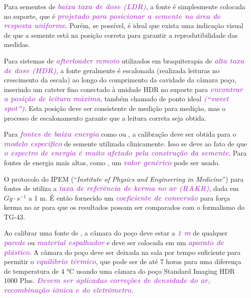 \documentclass[11pt,a4paper]{article}
\begin{document}
	
	Para sementes de \textcolor{MediumOrchid}{\textbf{\textit{baixa taxa de dose (LDR)}}}, a fonte é simplesmente colocada no suporte, que é \textcolor{MediumOrchid}{\textbf{\textit{projetado para posicionar a semente na área de resposta uniforme}}}. Porém, se possível, é ideal que exista uma indicação visual de que a semente está na posição correta para garantir a reprodutibilidade das medidas.

	Para sistemas de \textcolor{MediumOrchid}{\textbf{\textit{afterloader remoto}}} utilizados em braquiterapia de \textcolor{MediumOrchid}{\textbf{\textit{alta taxa de dose (HDR)}}}, a fonte geralmente é escalonada (realizada leituras no crescimento da escala) ao longo do comprimento da cavidade da câmara poço, inserindo um cateter fino conectado à unidade HDR no suporte para \textcolor{MediumOrchid}{\textbf{\textit{encontrar a posição de leitura máxima}}}, também chamado de ponto ideal \textcolor{MediumOrchid}{\textbf{\textit{(``sweet spot'')}}}. Esta posição deve ser consistente de medição para medição, mas o processo de escalonamento garante que a leitura correta seja obtida.

	Para \textcolor{MediumOrchid}{\textbf{\textit{fontes de baixa energia}}} como  ou , a calibração deve ser obtida para o \textcolor{MediumOrchid}{\textbf{\textit{modelo específico}}} de semente utilizada clinicamente. Isso se deve ao fato de que \textcolor{MediumOrchid}{\textbf{\textit{o espectro de energia é muito afetado pela construção da semente}}}. Para fontes de energia mais altas, como , um \textcolor{MediumOrchid}{\textbf{\textit{valor genérico}}} pode ser usado.

	O protocolo do IPEM (``\textit{Institute of Physics and Engineering in Medicine}'') para fontes de  utiliza a \textcolor{MediumOrchid}{\textbf{\textit{taxa de referência de kerma no ar (RAKR)}}}, dada em $Gy \cdot s^{-1}$ a 1 m. É então fornecido um \textcolor{MediumOrchid}{\textbf{\textit{coeficiente de conversão}}} para força kerma no ar para que os resultados possam ser comparados com o formalismo do TG-43.

	Ao calibrar uma fonte de , a câmara do poço deve estar a \textcolor{MediumOrchid}{\textbf{\textit{1 m}}} de qualquer \textcolor{MediumOrchid}{\textbf{\textit{parede}}} ou \textcolor{MediumOrchid}{\textbf{\textit{material espalhador}}} e deve ser colocada em um \textcolor{MediumOrchid}{\textbf{\textit{aparato de plástico}}}. A câmara do poço deve ser deixada na sala por tempo suficiente para permitir o \textcolor{MediumOrchid}{\textbf{\textit{equilíbrio térmico}}}, que pode ser de até 7 horas para uma diferença de temperatura de 4 °C usando uma câmara do poço Standard Imaging HDR 1000 Plus. \textcolor{MediumOrchid}{\textbf{\textit{Devem ser aplicadas correções de densidade do ar, recombinação iônica e do eletrômetro}}}. 
\end{document}
